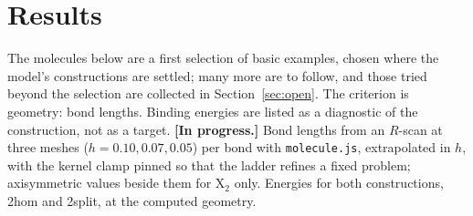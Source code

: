 \documentclass[11pt]{article}
\begin{document}
\section{Results}
\label{sec:results}

The molecules below are a first selection of basic examples, chosen where the model's constructions
are settled; many more are to follow, and those tried beyond the selection are collected in
Section~\ref{sec:open}. The criterion is geometry: bond lengths. Binding energies are listed as a
diagnostic of the construction, not as a target.
\textbf{[In progress.]} Bond lengths from an $R$-scan at three meshes ($h = 0.10, 0.07, 0.05$) per
bond with \texttt{molecule.js}, extrapolated in $h$, with the kernel clamp pinned so that the
ladder refines a fixed problem; axisymmetric values beside them for X$_2$ only.
Energies for both constructions, 2hom and 2split, at the computed geometry.
\end{document}
